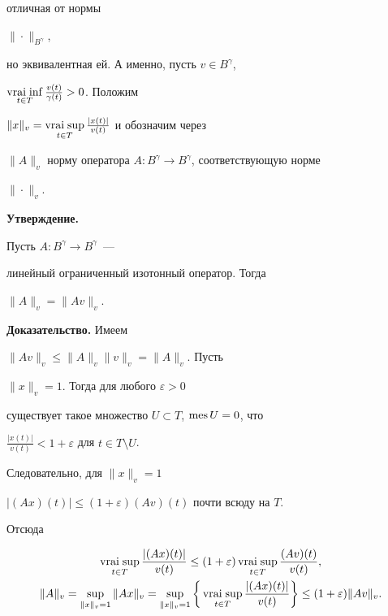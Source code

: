 отличная от нормы


$\|\cdot\|_{B^{\gamma}}$,


но эквивалентная ей. А именно, пусть $v\in B^\gamma$,


$\vraiinf\limits_{t\in T}\frac{v(t)}{\gamma(t)} >0$. Положим


$\|x\|_v = \vraisup\limits_{t\in


T}\frac{|x(t)|}{v(t)}$ и обозначим через


$\|A\|_v$ норму оператора $A:B^\gamma\to B^\gamma$, соответствующую норме


$\|\cdot\|_v$.


\medskip





{\bf Утверждение.} {\it


Пусть $A:B^\gamma\to B^\gamma$\ ---


линейный ограниченный изотонный оператор. Тогда


$\|A\|_v = \|Av\|_v$.


}


\medskip





{\bf Доказательство.} Имеем


$\|Av\|_v\leq  \|A\|_v \|v\|_v = \|A\|_v$. Пусть


$\|x\|_v=1$. Тогда для любого $\varepsilon >0$


существует такое множество $U\subset T$, $\operatorname{mes} U=0$, что


$\frac{|x(t)|}{v(t)}<1+\varepsilon$ для $t\in T\setminus U$.


Следовательно, для $\|x\|_v=1$


$|(Ax)(t)|\leq(1+\varepsilon)(Av)(t)$ почти всюду на $T$.


Отсюда


\begin{gather*}


\vraisup_{t\in T}\frac{|(Ax)(t)|}{v(t)} \leq (1+\varepsilon)


\vraisup_{t\in T}\frac{(Av)(t)}{v(t)},\\


%


\|A\|_v =


\sup_{\|x\|_v=1} \|Ax\|_v=


\sup_{\|x\|_v=1}


\bigg\{\vraisup_{t\in T}\frac{|(Ax)(t)|}{v(t)}\bigg\}


\leq (1+\varepsilon)\|Av\|_v.


\end{gather*}


